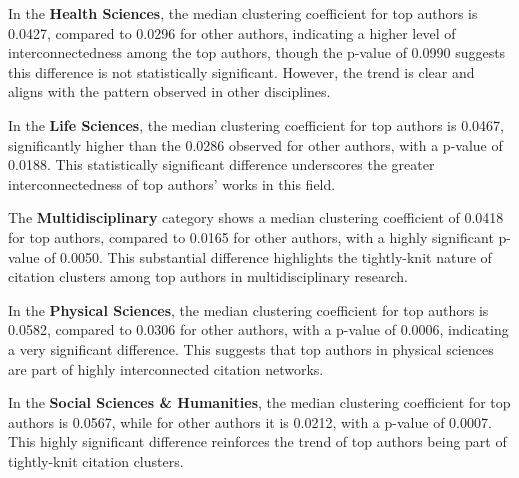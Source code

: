 In the \textbf{Health Sciences}, the median clustering coefficient for top
authors is 0.0427, compared to 0.0296 for other authors, indicating a higher
level of interconnectedness among the top authors, though the p-value of 0.0990
suggests this difference is not statistically significant. However, the trend
is clear and aligns with the pattern observed in other disciplines.

In the \textbf{Life Sciences}, the median clustering coefficient for top
authors is 0.0467, significantly higher than the 0.0286 observed for other
authors, with a p-value of 0.0188. This statistically significant difference
underscores the greater interconnectedness of top authors' works in this field.

The \textbf{Multidisciplinary} category shows a median clustering coefficient
of 0.0418 for top authors, compared to 0.0165 for other authors, with a highly
significant p-value of 0.0050. This substantial difference highlights the
tightly-knit nature of citation clusters among top authors in multidisciplinary
research.

In the \textbf{Physical Sciences}, the median clustering coefficient for top
authors is 0.0582, compared to 0.0306 for other authors, with a p-value of
0.0006, indicating a very significant difference. This suggests that top
authors in physical sciences are part of highly interconnected citation
networks.

In the \textbf{Social Sciences \& Humanities}, the median clustering
coefficient for top authors is 0.0567, while for other authors it is 0.0212,
with a p-value of 0.0007. This highly significant difference reinforces the
trend of top authors being part of tightly-knit citation clusters.
